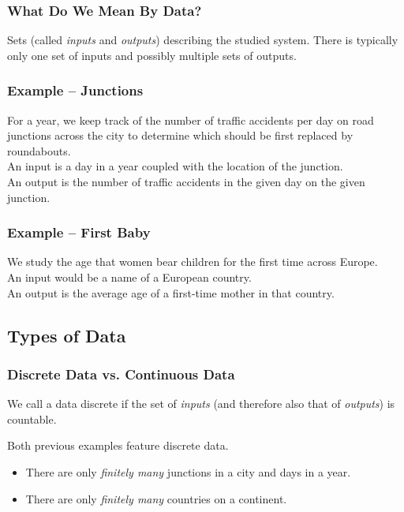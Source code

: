 \documentclass[aspectratio=169,11pt,svgnames,handout]{beamer}
\begin{document}
\begin{frame}
 \frametitle{What Do We Mean By Data?}
 \begin{tcolorbox}[title=Data]
  \alert{Sets} (called \emph{inputs} and \emph{outputs}) describing the studied
  system. There is typically only one set of inputs and possibly multiple sets
  of outputs.
 \end{tcolorbox}
\end{frame}

\begin{frame}
 \frametitle{Example -- Junctions}
 For a year, we keep track of the number of traffic accidents per day on road
 junctions across the city to determine which should be first replaced by
 roundabouts.\\
 \pause
 An \alert{input} is a day in a year coupled with the location of the
 junction.\\
 \pause
 An \alert{output} is the number of traffic accidents in the given day on the
 given junction.
\end{frame}

\begin{frame}
 \frametitle{Example -- First Baby}
 We study the age that women bear children for the first time across Europe.\\
 \pause
 An \alert{input} would be a name of a European country.\\
 An \alert{output} is the average age of a first-time mother in that country.
\end{frame}

\subsection{Types of Data}

\begin{frame}
 \subsectionpage
\end{frame}

\begin{frame}
 \frametitle{Discrete Data vs. Continuous Data}
 \begin{tcolorbox}[title=Discrete Data]
  We call a data \alert{discrete} if the set of \emph{inputs} (and therefore also
  that of \emph{outputs}) is \alert{countable}.
 \end{tcolorbox}
 \pause
 Both previous examples feature \alert{discrete} data.
 \begin{itemize}[label=\textbullet]
  \item There are only \emph{finitely many} junctions in a city and days in a
   year.
  \pause
  \item There are only \emph{finitely many} countries on a continent.
 \end{itemize}
\end{frame}
\end{document}
